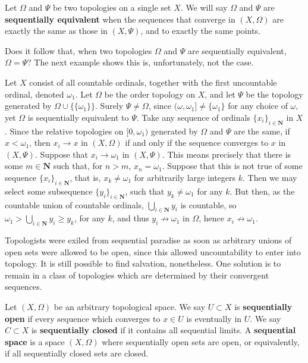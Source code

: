\begin{example}
\begin{definition}
    Let $\Omega$ and $\Psi$ be two topologies on a single set $X$. We will say $\Omega$ and $\Psi$ are {\bf sequentially equivalent} when the sequences that converge in $(X,\Omega)$ are exactly the same as those in $(X, \Psi)$, and to exactly the same points.
\end{definition}

Does it follow that, when two topologies $\Omega$ and $\Psi$ are sequentially equivalent, $\Omega = \Psi$? The next example shows this is, unfortunately, not the case.

\begin{example}
    Let $X$ consist of all countable ordinals, together with the first uncountable ordinal, denoted $\omega_1$. Let $\Omega$ be the order topology on $X$, and let $\Psi$ be the topology generated by $\Omega \cup \{ \{ \omega_1 \} \}$. Surely $\Psi \neq \Omega$, since $(\omega, \omega_1] \neq \{ \omega_1 \}$ for any choice of $\omega$, yet $\Omega$ is sequentially equivalent to $\Psi$. Take any sequence of ordinals $\{ x_i \}_{i \in \mathbf{N}}$ in $X$. Since the relative topologies on $[0,\omega_1)$ generated by $\Omega$ and $\Psi$ are the same, if $x < \omega_1$, then $x_i \to x$ in $(X, \Omega)$ if and only if the sequence converges to $x$ in $(X,\Psi)$. Suppose that $x_i \to \omega_1$ in $(X, \Psi)$. This means precisely that there is some $m \in \mathbf{N}$ such that, for $n > m$, $x_n = \omega_1$. Suppose that this is not true of some sequence $\{ x_i \}_{i \in \mathbf{N}}$, that is, $x_k \neq \omega_1$ for arbitrarily large integers $k$. Then we may select some subsequence $\{ y_i \}_{i \in \mathbf{N}}$, such that $y_k \neq \omega_1$ for any $k$. But then, as the countable union of countable ordinals, $\bigcup_{i \in \mathbf{N}} y_i$ is countable, so $\omega_1 > \bigcup_{i \in \mathbf{N}} y_i \geq y_k$, for any $k$, and thus $y_i \not \to \omega_1$ in $\Omega$, hence $x_i \not \to \omega_1$.
\end{example}

Topologists were exiled from sequential paradise as soon as arbitrary unions of open sets were allowed to be open, since this allowed uncountability to enter into topology. It is still possible to find salvation, nonetheless. One solution is to remain in a class of topologies which are determined by their convergent sequences.

\begin{definition}
    Let $(X,\Omega)$ be an arbitrary topological space. We say $U \subset X$ is {\bf sequentially open} if every sequence which converges to $x \in U$ is eventually in $U$. We say $C \subset X$ is {\bf sequentially closed} if it contains all sequential limits. A {\bf sequential space} is a space $(X,\Omega)$ where sequentially open sets are open, or equivalently, if all sequentially closed sets are closed.
\end{definition}


\end{example}
